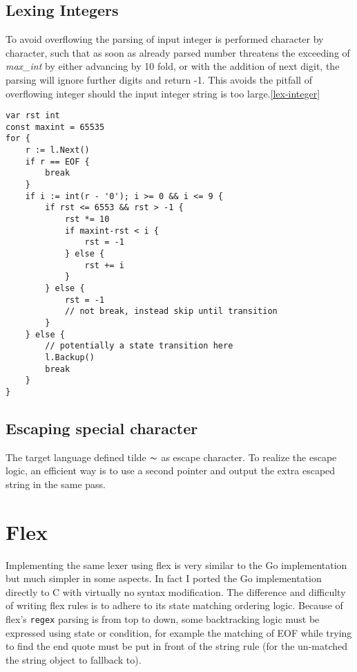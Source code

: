 \documentclass[%
 aip,
 jmp,%
 amsmath,amssymb,
 reprint,%
]{revtex4-1}
\begin{document}
\subsection{Lexing Integers}

To avoid overflowing the parsing of input integer is performed character by character, such that as soon as already parsed number threatens the exceeding of \textit{max\_int} by either advancing by 10 fold, or with the addition of next digit, the parsing will ignore further digits and return -1. This avoids the pitfall of overflowing integer should the input integer string is too large.\ref{lex-integer}
\begin{widetext}
\begin{lstlisting}[label=lex-integer,caption=lexInteger]
var rst int
const maxint = 65535
for {
	r := l.Next()
	if r == EOF {
		break
	}
	if i := int(r - '0'); i >= 0 && i <= 9 {
		if rst <= 6553 && rst > -1 {
			rst *= 10
			if maxint-rst < i {
				rst = -1
			} else {
				rst += i
			}
		} else {
			rst = -1
			// not break, instead skip until transition
		}
	} else {
		// potentially a state transition here
		l.Backup()
		break
	}
}	
\end{lstlisting}
\end{widetext}

\subsection{Escaping special character}
The target language defined tilde $\thicksim$ as escape character. To realize the escape logic, an efficient way is to use a second pointer and output the extra escaped string in the same pass.

\section{Flex}
Implementing the same lexer using flex is very similar to the Go implementation but much simpler in some aspects. In fact I ported the Go implementation directly to C with virtually no syntax modification. The difference and difficulty of writing flex rules is to adhere to its state matching ordering logic. Because of flex's \texttt{regex} parsing is from top to down, some backtracking logic must be expressed using state or condition, for example the matching of EOF while trying to find the end quote must be put in front of the string rule (for the un-matched the string object to fallback to).
\end{document}
